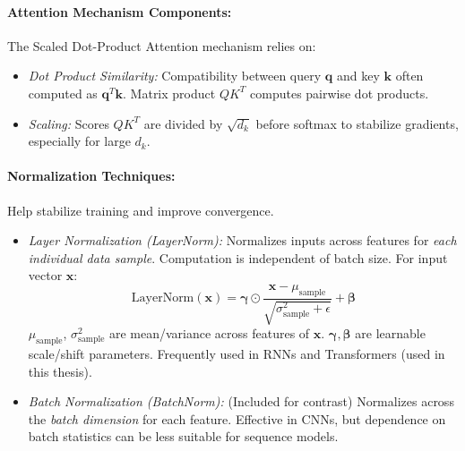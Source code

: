 \begin{appendices}
  \paragraph{Attention Mechanism Components:}
  The Scaled Dot-Product Attention mechanism relies on:
  \begin{itemize}
    \item \textit{Dot Product Similarity:} Compatibility between query \( \bm{q} \) and key \( \bm{k} \) often computed as \( \bm{q}^T \bm{k} \). Matrix product \( QK^T \) computes pairwise dot products.
    \item \textit{Scaling:} Scores \( QK^T \) are divided by \( \sqrt{d_k} \) before softmax to stabilize gradients, especially for large \( d_k \).
  \end{itemize}

  \paragraph{Normalization Techniques:}
  Help stabilize training and improve convergence.
  \begin{itemize}
    \item \textit{Layer Normalization (LayerNorm):} Normalizes inputs across features for \textit{each individual data sample}. Computation is independent of batch size. For input vector \( \bm{x} \):
          \begin{equation}
            \text{LayerNorm}(\bm{x}) = \bm{\gamma} \odot \frac{\bm{x} - \mu_{\text{sample}}}{\sqrt{\sigma^2_{\text{sample}} + \epsilon}} + \bm{\beta}
            \label{eq:layernorm} %
          \end{equation}
          \( \mu_{\text{sample}} \), \( \sigma^2_{\text{sample}} \) are mean/variance across features of \( \bm{x} \). \( \bm{\gamma}, \bm{\beta} \) are learnable scale/shift parameters. Frequently used in RNNs and Transformers (used in this thesis).
    \item \textit{Batch Normalization (BatchNorm):} (Included for contrast) Normalizes across the \textit{batch dimension} for each feature. Effective in CNNs, but dependence on batch statistics can be less suitable for sequence models.
  \end{itemize}


\end{appendices}

